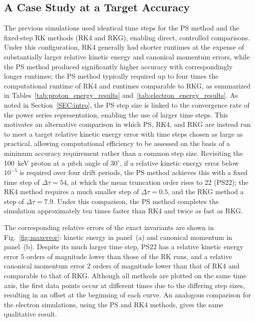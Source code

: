 \documentclass[draft]{agujournal2019}
\begin{document}
\subsection{A Case Study at a Target Accuracy}\label{SEC:Dip Discussion}
The previous simulations used identical time steps for the PS method and the fixed-step RK methods (RK4 and RKG), enabling direct, controlled comparisons. Under this configuration, RK4 generally had shorter runtimes at the expense of substantially larger relative kinetic energy and canonical momentum errors, while the PS method produced significantly higher accuracy with correspondingly longer runtimes; the PS method typically required up to four times the computational runtime of RK4 and runtimes comparable to RKG, as summarized in Tables~\ref{tab:proton_energy_results} and~\ref{tab:electron_energy_results}. As noted in Section~\ref{SEC:intro}, the PS step size is linked to the convergence rate of the power series representation, enabling the use of larger time steps. This motivates an alternative comparison in which PS, RK4, and RKG are instead run to meet a target relative kinetic energy error with time steps chosen as large as practical, allowing computational efficiency to be assessed on the basis of a minimum accuracy requirement rather than a common step size. Revisiting the 100~keV proton at a pitch angle of $30^\circ$, if a relative kinetic energy error below $10^{-5}$ is required over four drift periods, the PS method achieves this with a fixed time step of $\Delta\tau=54$, at which the mean truncation order rises to 22 (PS22); the RK4 method requires a much smaller step of $\Delta\tau=0.5$, and the RKG method a step of $\Delta\tau=7.9$. Under this comparison, the PS method completes the simulation approximately ten times faster than RK4 and twice as fast as RKG. 

The corresponding relative errors of the exact invariants are shown in Fig.~\ref{fig:maxerror}: kinetic energy in panel~(a) and canonical momentum in panel~(b). Despite its much larger time step, PS22 has a relative kinetic energy error 5 orders of magnitude lower than those of the RK runs, and a relative canonical momentum error 2 orders of magnitude lower than that of RK4 and comparable to that of RKG. Although all methods are plotted on the same time axis, the first data points occur at different times due to the differing step sizes, resulting in an offset at the beginning of each curve. An analogous comparison for the electron simulations, using the PS and RK4 methods, gives the same qualitative result.
\end{document}
